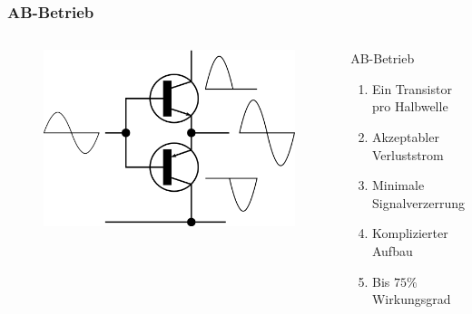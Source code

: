 \begin{frame}
  \frametitle{AB-Betrieb}
  \begin{columns}[c]
    \begin{center}
      \begin{figure}
        \includegraphics[width=1\textwidth,height=.8\textheight,keepaspectratio]{a07/Electronic_Amplifier_Push-pull.png}
      \end{figure}
    \end{center}
     \large
    \begin{block}{AB-Betrieb}
      \begin{enumerate}
        \item Ein Transistor pro Halbwelle
        \item Akzeptabler Verluststrom
        \item Minimale Signalverzerrung
        \item Komplizierter Aufbau
        \item Bis $75\%$ Wirkungsgrad
      \end{enumerate}
    \end{block}
  \end{columns}
\end{frame}

